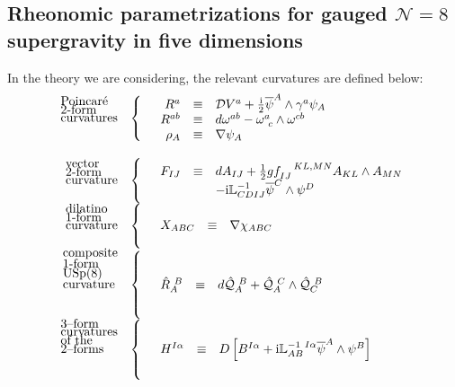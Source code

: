 \documentclass[a4paper,12pt]{article}
\def\bar{\overline}\end {picture}}
\begin{document}
\subsection{Rheonomic parametrizations for gauged $\mathcal{N}=8$  supergravity
in five dimensions}
In the theory we are considering, the relevant curvatures are defined below:
\begin{equation}
  \begin{array}{rl}
    \left . \mbox{\vbox{\hbox{Poincar\'e}
  \hbox{2-form}\hbox{curvatures}}} \quad \right \{ & \begin{array}{rcl}
 R^a &\equiv& \mathcal{D} V^a +{{\rm i}\over 2} \bar{\psi}^A\wedge\gamma^a\psi_A \\
R^{ab} &\equiv& d\omega ^{ab} - \omega ^a_{~c}\wedge\omega ^{cb}  \\
\rho_A &\equiv& \nabla\psi_A  \
\end{array}  \\
\null & \null \\
   \left . \mbox{\vbox{\hbox{vector}
  \hbox{2-form}\hbox{curvature}}}  \quad\right \{ & \begin{array}{rcl}
 F_{IJ} &\equiv& dA_{IJ}+\frac{1}{2} g f_{IJ}^{~~~KL,MN}A_{KL}\wedge A_{MN}\\
  \null & \null & -
{\rm i} \mathbb{L}^{-1}_{CDIJ}\bar{\psi}^C\wedge\psi^D \
\end{array}  \\
   \left . \mbox{\vbox{\hbox{dilatino}
  \hbox{1-form}\hbox{curvature}}}  \quad\right \{ & \begin{array}{rcl}
  X_{ABC} &\equiv& \nabla\chi_{ABC} \
\end{array}  \\
   \left . \mbox{\vbox{\hbox{composite}
  \hbox{1-form}\hbox{$\mathrm{USp(8)}$}\hbox{curvature}}}  \quad\right \{  &
  \begin{array}{rcl}
  \hat{R}_A^{~B} &\equiv& d\hat{\mathcal{Q}}_A^{~B} +
  \hat{\mathcal{Q}}_A^{~C}\wedge\hat{\mathcal{Q}}_C^{~B}\
\end{array}  \\
   \left . \mbox{\vbox{\hbox{3--form}
  \hbox{curvatures}\hbox{of the}\hbox{2--forms}}}  \quad \right \{  & \begin{array}{rcl}
  H^{I\alpha} &\equiv&
D\left[B^{I\alpha}+{\rm
i}\mathbb{L}^{-1~I\alpha}_{AB}\bar{\psi}^A\wedge\psi^B\right]\
\end{array} \
  \end{array}
\label{defcurvatures}
\end{equation}
\end{document}
